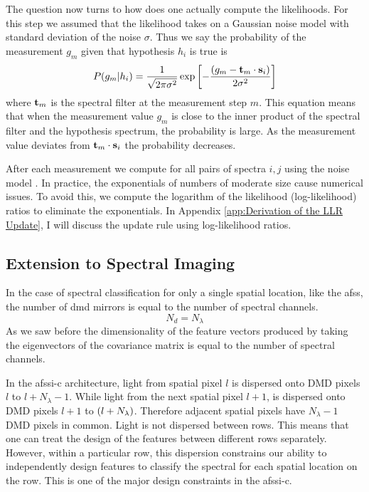 The question now turns to how does one actually compute the likelihoods. For this step we assumed that the likelihood takes on a Gaussian noise model with standard deviation of the noise $\sigma$. Thus we say the probability of the measurement $g_m$ given that hypothesis $h_i$ is true is 
%
\begin{equation}
	\prob{g_m | h_i } = \frac{1}{\sqrt{2 \pi \sigma^2 }} 
	\exp \left[ - \frac{ \ap{g_m - \mb{t}_m \cdot \mb{s}_i } }{2 \sigma^2} \right]
	\label{eq:noiseModel1}
\end{equation}
%
where $\displaystyle \mathbf{t}_m$ is the spectral filter at the measurement step $m$. This equation means that when the measurement value $g_m$ is close to the inner product of the spectral filter and the hypothesis spectrum, the probability is large. As the measurement value deviates from $\displaystyle \mathbf{t}_m \cdot \displaystyle \mathbf{s}_i $ the probability decreases.

After each measurement we compute  for all pairs of spectra ${i,j}$ using the noise model . In practice, the exponentials of numbers of moderate size cause numerical issues. To avoid this, we compute the logarithm of the likelihood (log-likelihood) ratios to eliminate the exponentials. In Appendix \ref{app:Derivation of the LLR Update}, I will discuss the update rule using log-likelihood ratios. 

\subsection{Extension to Spectral Imaging}

In the case of spectral classification for only a single spatial location, like the \gls{afss}, the number of \gls{dmd} mirrors is equal to the number of spectral channels. 
%
\begin{equation}
	N_d = N_{\lambda} 
\end{equation}
%
As we saw before the dimensionality of the feature vectors produced by taking the eigenvectors of the covariance matrix is equal to the number of spectral channels. 

In the \gls{afssi-c} architecture, light from spatial pixel $l$ is dispersed onto DMD pixels $l$ to $l + N_{\lambda} - 1$. While light from the next spatial pixel $l + 1$, is dispersed onto DMD pixels $l + 1$ to $ \ap{l + N_{\lambda}} $. Therefore adjacent spatial pixels have $N_{\lambda} - 1$ DMD pixels in common. Light is not dispersed between rows. This means that one can treat the design of the features between different rows separately. However, within a particular row, this dispersion constrains our ability to independently design features to classify the spectral for each spatial location on the row. This is one of the major design constraints in the \gls{afssi-c}. 

